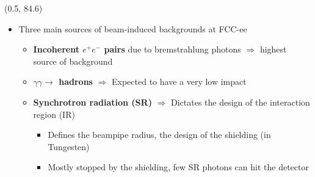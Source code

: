 \documentclass[final,xcolor={dvipsnames,svgnames,x11names,table}]{beamer}
\begin{document}
\begin{frame}
\begin{textblock}{39.5}
\begin{tcolorbox}[title=The simulation of the drift chamber with FCCSW]
  \end{tcolorbox}
\end{textblock}



\begin{textblock}{43}(0.5, 84.6)
  \begin{tcolorbox}[title=Beam-induced backgrounds and the impact on the drift chamber]

  \begin{itemize}
    \item Three main sources of beam-induced backgrounds at FCC-ee \vspace{0.5cm}
    \begin{itemize}
      \item \textbf{Incoherent $e^+e^-$ pairs} due to bremstrahlung photons $\Rightarrow$ highest source of background \vspace{0.3cm}
      \item \textbf{$\gamma\gamma\rightarrow$ hadrons} $\Rightarrow$ Expected to have a very low impact \vspace{0.3cm}
      \item \textbf{Synchrotron radiation (SR)} $\Rightarrow$ Dictates the design of the interaction region (IR) \vspace{0.3cm}
        \begin{itemize}
          \item Defines the beampipe radius, the design of the shielding (in Tungesten)
          \item Mostly stopped by the shielding, few SR photons can hit the detector
        \end{itemize}
    \end{itemize}
  \end{itemize}


\end{tcolorbox}
\end{textblock}
\end{frame}
\end{document}
